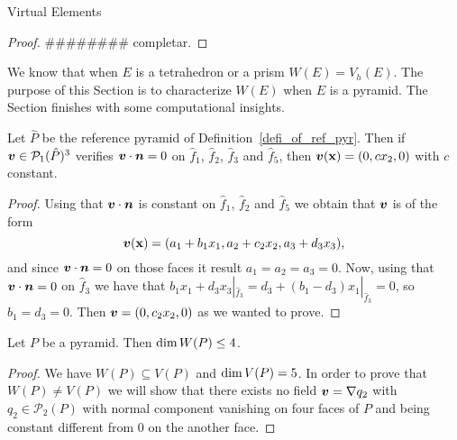 \begin{chapter}{Virtual Elements}
\begin{theorem}
\end{theorem}
\begin{proof}
  {\color{blue}\#\#\#\#\#\#\#\# completar.}
\end{proof}
We know that when $E$ is a tetrahedron or a prism $W(E)=V_h(E)$. The purpose of this Section is to characterize $W(E)$ when $E$ is a pyramid. The Section finishes with some computational insights. 
\begin{lemma}\label{L3}
Let $\hat P$ be the reference pyramid 
of Definition~\ref{defi_of_ref_pyr}.
Then if $\boldsymbol{v} \in\mathcal P_1(\hat P)^3$ verifies $\boldsymbol{v} \cdot \boldsymbol{n} =0$ on $\hat f_1$, $\hat f_2$, $\hat f_3$ and
$\hat f_5$, then $\boldsymbol{v}({\bf x})=(0,cx_2,0)$ with $c$ constant.
\end{lemma}
\begin{proof}
Using that $\boldsymbol{v}\cdot\boldsymbol{n}$ is constant on $\hat f_1$, $\hat f_2$ and
$\hat f_5$ we obtain that $\boldsymbol{v}$ is of the form
\[
\boldsymbol{v}({\bf x}) = (a_1+b_1x_1, a_2+c_2x_2,a_3+d_3x_3),
\]
and since $\boldsymbol{v}\cdot\boldsymbol{n}=0$ on those faces it result
$a_1=a_2=a_3=0$. Now, using that $\boldsymbol{v}\cdot\boldsymbol{n}=0$ on
$\hat f_3$  we have that $b_1x_1+d_3x_3|_{\hat f_3}=d_3+(b_1-d_3)x_1|_{\hat f_3}=0$, so $b_1=d_3=0$. Then $\boldsymbol{v}=(0,c_2x_2,0)$ as we wanted to prove.
\end{proof}

\begin{lemma}\label{L4}
Let $P$ be a pyramid. Then $\mbox{dim\,}W(P)\le4$.
\end{lemma}
\begin{proof}
We have $W(P)\subseteq V(P)$ and $\mbox{dim\,}V(P)=5$. In order to prove that $W(P)\ne
V(P)$ we will show that there exists no field
$\boldsymbol{v}=\nabla q_2$ with $q_2\in \mathcal P_2(P)$ with normal
component vanishing on four faces of $P$ and being constant different from $0$ on
the another face.


\end{proof}
\end{chapter}
